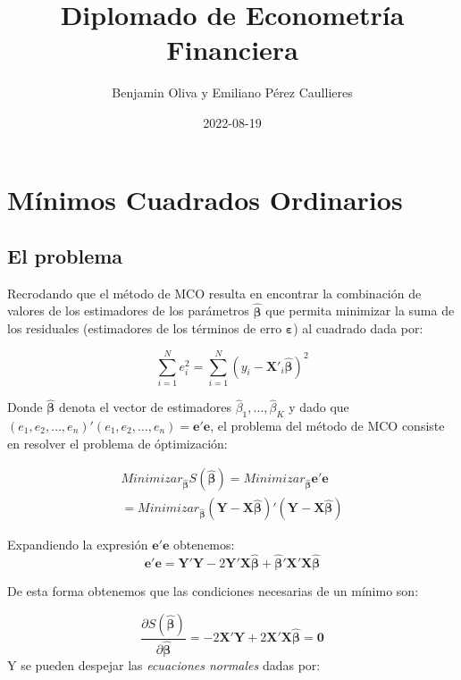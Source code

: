 \documentclass[
]{book}
\title{Diplomado de Econometría Financiera}
\author{Benjamin Oliva y Emiliano Pérez Caullieres}
\date{2022-08-19}
\begin{document}
\maketitle

{
\setcounter{tocdepth}{1}
\tableofcontents
}
\hypertarget{muxednimos-cuadrados-ordinarios}{%
\chapter{Mínimos Cuadrados Ordinarios}\label{muxednimos-cuadrados-ordinarios}}

\hypertarget{el-problema}{%
\section{El problema}\label{el-problema}}

Recrodando que el método de MCO resulta en encontrar la combinación de valores de los estimadores de los parámetros \(\hat{\boldsymbol{\beta}}\) que permita minimizar la suma de los residuales (estimadores de los términos de erro \(\boldsymbol{\varepsilon}\)) al cuadrado dada por:

\[
    \sum^{N}_{i=1}{e^2_i} = \sum^{N}_{i = 1}{(y_i - \mathbf{X}'_i \hat{\boldsymbol{\beta}})^2}
\]

Donde \(\hat{\boldsymbol{\beta}}\) denota el vector de estimadores \(\hat{\beta}_1, \ldots, \hat{\beta}_K\) y dado que \((e_1, e_2, \ldots, e_n)'(e_1, e_2, \ldots, e_n) = {\mathbf{e'e}}\), el problema del método de MCO consiste en resolver el problema de óptimización:

\begin{eqnarray*}
Minimizar_{\hat{\boldsymbol \beta}} S(\hat{\boldsymbol \beta})  =  Minimizar_{\hat{\boldsymbol \beta}} \mathbf{e'e} \\
    =  Minimizar_{\hat{\boldsymbol \beta}} (\mathbf{Y}-\mathbf{X}\hat{\boldsymbol \beta})'(\mathbf{Y}-\mathbf{X}\hat{\boldsymbol \beta})
\end{eqnarray*}

Expandiendo la expresión \(\mathbf{e'e}\) obtenemos:
\[
    \mathbf{e'e} = \mathbf{Y'Y} - 2 \mathbf{Y'X} \hat{\boldsymbol \beta} + \hat{\boldsymbol \beta}' \mathbf{X'X}\hat{\boldsymbol \beta}
\]

De esta forma obtenemos que las condiciones necesarias de un mínimo son:

\[
    \frac{\partial S(\hat{\boldsymbol \beta})}{\partial \hat{\boldsymbol \beta}} = -2{\mathbf{X'Y}} + 2{\mathbf{X'X}} \hat{\boldsymbol{\beta}} = \mathbf{0}
\]
Y se pueden despejar las \textit{ecuaciones normales} dadas por:
\end{document}
